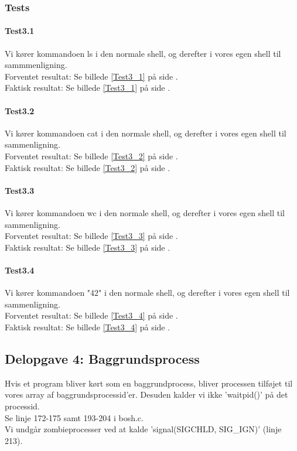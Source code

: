 \subsubsection{Tests}
\paragraph{Test3.1}
Vi kører kommandoen ls i den normale shell, og derefter i vores egen shell til sammmenligning.
\\Forventet resultat: Se billede \ref{Test3_1} på side \pageref{Test3_1}.
\\Faktisk resultat: Se billede \ref{Test3_1} på side \pageref{Test3_1}.

\paragraph{Test3.2}
Vi kører kommandoen cat i den normale shell, og derefter i vores egen shell til sammenligning.
\\Forventet resultat: Se billede \ref{Test3_2} på side \pageref{Test3_2}.
\\Faktisk resultat: Se billede \ref{Test3_2} på side \pageref{Test3_2}.

\paragraph{Test3.3}
Vi kører kommandoen wc i den normale shell, og derefter i vores egen shell til sammenligning.
\\Forventet resultat: Se billede \ref{Test3_3} på side \pageref{Test3_3}.
\\Faktisk resultat: Se billede \ref{Test3_3} på side \pageref{Test3_3}.

\paragraph{Test3.4}
Vi kører kommandoen "42" i den normale shell, og derefter i vores egen shell til sammenligning.
\\Forventet resultat: Se billede \ref{Test3_4} på side \pageref{Test3_4}.
\\Faktisk resultat: Se billede \ref{Test3_4} på side \pageref{Test3_4}.

\subsection{Delopgave 4: Baggrundsprocess}
\label{D4}
Hvis et program bliver kørt som en baggrundprocess, bliver processen tilføjet til vores array af baggrundsprocessid'er. Desuden kalder vi ikke 'waitpid()' på det processid. 
\\Se linje 172-175 samt 193-204 i bosh.c.
\\Vi undgår zombieprocesser ved at kalde 'signal(SIGCHLD, SIG\_IGN)' (linje 213).
